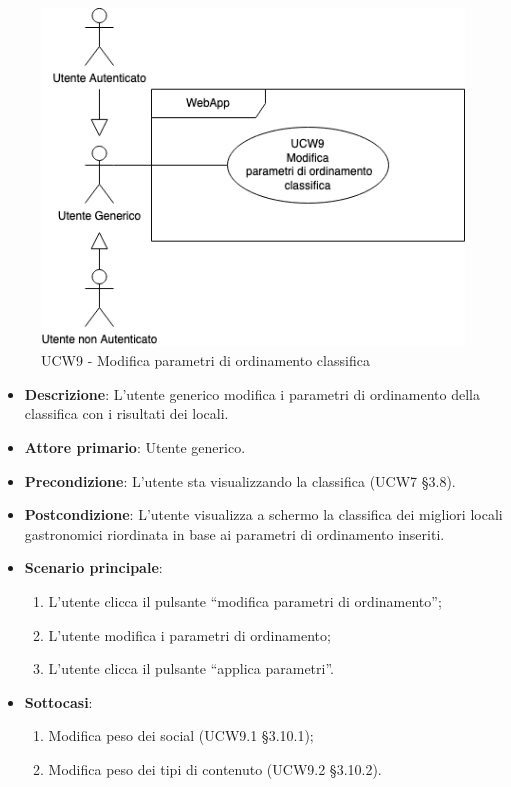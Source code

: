 \begin{figure}[!h]
\centering
    \includegraphics[scale=0.5]{UC_images/UCW9.png}
    \caption{UCW9 - Modifica parametri di ordinamento classifica}
\end{figure}
\begin{itemize}
	\item \textbf{Descrizione}: L'utente generico modifica i parametri di ordinamento della classifica con i risultati dei locali.
    \item \textbf{Attore primario}: Utente generico.
    \item \textbf{Precondizione}: L’utente sta visualizzando la classifica (UCW7 §3.8).
    \item \textbf{Postcondizione}: L’utente visualizza a schermo la classifica dei migliori locali gastronomici riordinata in base ai parametri di ordinamento inseriti.
    \item \textbf{Scenario principale}: 
    \begin{enumerate}
        \item L’utente clicca il pulsante “modifica parametri di ordinamento”;
        \item L’utente modifica i parametri di ordinamento;
        \item L’utente clicca il pulsante “applica parametri”.
    \end{enumerate}

    \item \textbf{Sottocasi}:
    \begin{enumerate}
        \item Modifica peso dei social (UCW9.1 §3.10.1);
        \item Modifica peso dei tipi di contenuto (UCW9.2 §3.10.2).
    \end{enumerate}

\end{itemize}

